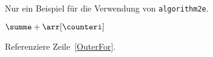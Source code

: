 \documentclass{exercss}
\begin{document}
	Nur ein Beispiel für die Verwendung von \texttt{algorithm2e}.
	\begin{pseudocode}
		\summe {}\;
		\For {\counteri \assign 1 \KwTo $\len[\arr]$ \label{OuterFor}} {
			 {
				\For {\counterj \assign 1 \KwTo \counteri \label{InnerFor}} {
					\summe \assign $\summe + \arr[\counteri]$\; \label{Addition}
				}
			}
		}
		\Return \summe\;
	\end{pseudocode}
	Referenziere Zeile~\ref{OuterFor}.
\end{document}

